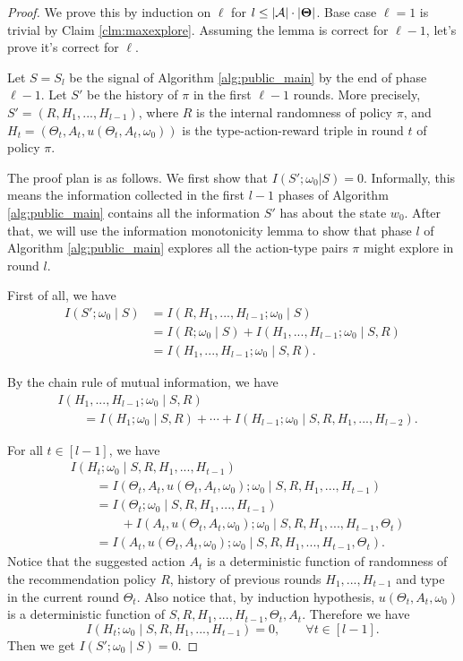 \begin{proof}
We prove this by induction on $\ell$ for $l \leq |\mathcal{A}|\cdot |\bold{\Theta}|$. Base case $\ell=1$ is trivial by Claim \ref{clm:maxexplore}. Assuming the lemma is correct for $\ell-1$, let's prove it's correct for $\ell$.

Let $S= S_l$ be the signal of Algorithm \ref{alg:public_main} by the end of phase $\ell-1$.  Let $S'$ be the history of $\pi$ in the first $\ell-1$ rounds. More precisely,
    $S' = (R, H_1,...,H_{l-1})$,
where $R$ is the internal randomness of policy $\pi$, and
    $H_t = (\Theta_t, A_t, u(\Theta_t, A_t, \omega_0))$
is the type-action-reward triple in round $t$ of policy $\pi$.

The proof plan is as follows. We first show that $I(S';\omega_0|S) =0 $. Informally, this means the information collected in the first $l-1$ phases of Algorithm \ref{alg:public_main} contains all the information $S'$ has about the state $w_0$. After that, we will use the information monotonicity lemma to show that phase $l$ of Algorithm \ref{alg:public_main} explores all the action-type pairs $\pi$ might explore in round $l$.

First of all, we have
\begin{align*}
I(S'; \omega_0\mid  S)
    &= I(R,H_1,...,H_{l-1}; \omega_0\mid  S)\\
   & = I(R; \omega_0\mid  S) + I(H_1,...,H_{l-1}; \omega_0\mid S, R) \\
    &= I(H_1,...,H_{l-1}; \omega_0\mid S, R).
\end{align*}

By the chain rule of mutual information, we have
\begin{align*}
 &I(H_1,...,H_{l-1}; \omega_0\mid S, R) \\
 &\qquad = I(H_1;\omega_0\mid S,R) + \cdots + I(H_{l-1}; \omega_0\mid S,R,H_1,...,H_{l-2}).
\end{align*}

For all $t \in [l-1]$, we have
\begin{align*}
&I(H_t; \omega_0\mid S,R,H_1,...,H_{t-1}) \\
&\qquad= I(\Theta_t, A_t, u(\Theta_t, A_t, \omega_0); \omega_0\mid S,R,H_1,...,H_{t-1}) \\
&\qquad= I(\Theta_t ; \omega_0\mid S,R,H_1,...,H_{t-1})\\
&\qquad\qquad+  I(A_t, u(\Theta_t, A_t, \omega_0); \omega_0\mid S,R,H_1,...,H_{t-1},\Theta_t) \\
&\qquad= I(A_t, u(\Theta_t, A_t, \omega_0); \omega_0\mid S,R,H_1,...,H_{t-1},\Theta_t).
\end{align*}
Notice that the suggested action $A_t$ is a deterministic function of randomness of the recommendation policy $R$,  history of previous rounds $H_1,...,H_{t-1}$ and type in the current round $\Theta_t$. Also notice that, by induction hypothesis, $u(\Theta_t, A_t, \omega_0)$ is a deterministic function of $S,R,H_1,...,H_{t-1},\Theta_t, A_t$. Therefore we have
\[
I(H_t; \omega_0\mid S,R,H_1,...,H_{t-1}) = 0, \qquad \forall t \in [l-1].
\]
Then we get
$ I(S'; \omega_0 \mid  S) = 0.$


\end{proof}
